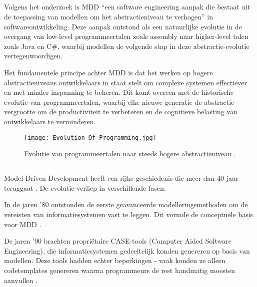 \subsection{}%

Volgens het onderzoek \textcite{Hailpern2006} is MDD “een software engineering aanpak die bestaat uit de toepassing van modellen om het abstractieniveau te verhogen” in softwareontwikkeling. Deze aanpak ontstond als een natuurlijke evolutie in de overgang van low-level programmeertalen zoals assembly naar higher-level talen zoals Java en C\#, waarbij modellen de volgende stap in deze abstractie-evolutie vertegenwoordigen.

Het fundamentele principe achter MDD is dat het werken op hogere abstractieniveaus ontwikkelaars in staat stelt om complexe systemen effectiever en met minder inspanning te beheren. Dit komt overeen met de historische evolutie van programmeertalen, waarbij elke nieuwe generatie de abstractie vergrootte om de productiviteit te verbeteren en de cognitieve belasting van ontwikkelaars te verminderen.

\begin{figure}[H]
    \centering
    \texttt{[image: Evolution\_Of\_Programming.jpg]}
    \caption[Evolution of programming]{\label{fig:evolution} Evolutie van programmeertalen naar steeds hogere abstractieniveau \autocite{Sufi_2023}.}
\end{figure}


\subsection{}%
Model Driven Development heeft een rijke geschiedenis die meer dan 40 jaar teruggaat \autocite{Henkel2010}. De evolutie verliep in verschillende fasen:

In de jaren '80 ontstonden de eerste geavanceerde modelleringsmethoden om de vereisten van informatiesystemen vast te leggen. Dit vormde de conceptuele basis voor MDD \autocite{Henkel2010}.

De jaren '90 brachten propriëtaire CASE-tools (Computer Aided Software Engineering), die informatiesystemen gedeeltelijk konden genereren op basis van modellen. Deze tools hadden echter beperkingen - vaak konden ze alleen codetemplates genereren waarna programmeurs de rest handmatig moesten aanvullen \autocite{Case_1985}.

